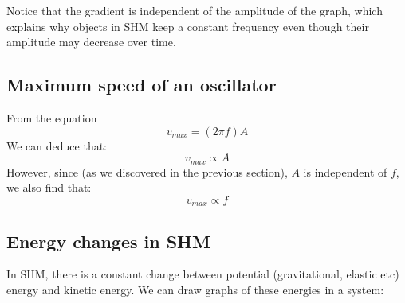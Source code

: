 \documentclass{article}
\begin{document}
\begin{center}
\end{center}

Notice that the gradient is independent of the amplitude of the graph, which
explains why objects in SHM keep a constant frequency even though their
amplitude may decrease over time.

\subsection*{Maximum speed of an oscillator}
From the equation 
\[
v_{max} = (2 \pi f)A
\]
We can deduce that:
\[
	v_{max} \propto A
\]
However, since (as we discovered in the previous section), $A$ is independent of
$f$, we also find that:
\[
	v_{max} \propto f
\]

\subsection*{Energy changes in SHM}
In SHM, there is a constant change between potential (gravitational, elastic
etc) energy and kinetic energy. We can draw graphs of these energies in a
system:
\end{document}
